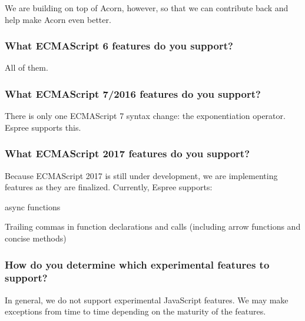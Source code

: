 We are building on top of Acorn, however, so that we can contribute back and help make Acorn even better.

\subsubsection*{What E\+C\+M\+A\+Script 6 features do you support?}

All of them.

\subsubsection*{What E\+C\+M\+A\+Script 7/2016 features do you support?}

There is only one E\+C\+M\+A\+Script 7 syntax change\+: the exponentiation operator. Espree supports this.

\subsubsection*{What E\+C\+M\+A\+Script 2017 features do you support?}

Because E\+C\+M\+A\+Script 2017 is still under development, we are implementing features as they are finalized. Currently, Espree supports\+:


\begin{DoxyItemize}
\item {\ttfamily async} functions
\item Trailing commas in function declarations and calls (including arrow functions and concise methods)
\end{DoxyItemize}

\subsubsection*{How do you determine which experimental features to support?}

In general, we do not support experimental Java\+Script features. We may make exceptions from time to time depending on the maturity of the features. 